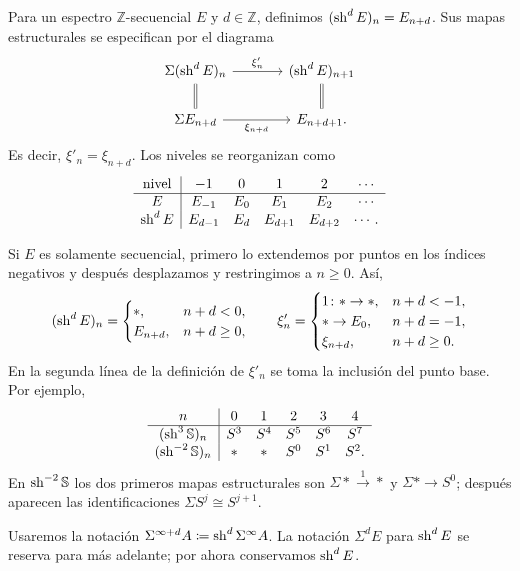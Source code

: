 \begin{defi}\label{defi:desplazamiento}
Para un espectro $\mathbb Z$-secuencial $E$ y $d\in\mathbb Z$, definimos $(\operatorname{sh}^dE)_n=E_{n+d}$. Sus mapas estructurales se especifican por el diagrama
\[
\begin{tikzcd}[column sep=large]
\Sigma(\sh^dE)_n \arrow[r,"\xi'_n"] \arrow[d,equal] & (\sh^dE)_{n+1} \arrow[d,equal]\\
\Sigma E_{n+d} \arrow[r,"\xi_{n+d}"'] & E_{n+d+1}.
\end{tikzcd}
\]
Es decir, $\xi'_n=\xi_{n+d}$. Los niveles se reorganizan como
\[
\begin{array}{c|ccccc}
\text{nivel}&-1&0&1&2&\cdots\\\hline
E&E_{-1}&E_0&E_1&E_2&\cdots\\
\operatorname{sh}^dE&E_{d-1}&E_d&E_{d+1}&E_{d+2}&\cdots.
\end{array}
\]
\end{defi}

Si $E$ es solamente secuencial, primero lo extendemos por puntos en los índices negativos y después desplazamos y restringimos a $n\ge0$. Así,
\[
(\operatorname{sh}^dE)_n=
\begin{cases}
*,&n+d<0,\\
E_{n+d},&n+d\ge0,
\end{cases}
\qquad
\xi'_n=
\begin{cases}
1\colon *\to*,&n+d<-1,\\
*\to E_0,&n+d=-1,\\
\xi_{n+d},&n+d\ge0.
\end{cases}
\]
En la segunda línea de la definición de $\xi'_n$ se toma la inclusión del punto base. Por ejemplo,
\[
\begin{array}{c|ccccc}
 n&0&1&2&3&4\\\hline
(\operatorname{sh}^3\mathbb S)_n&S^3&S^4&S^5&S^6&S^7\\
(\operatorname{sh}^{-2}\mathbb S)_n&*&*&S^0&S^1&S^2.
\end{array}
\]
En $\operatorname{sh}^{-2}\mathbb S$ los dos primeros mapas estructurales son $\Sigma*\xrightarrow{1}*$ y $\Sigma*\to S^0$; después aparecen las identificaciones $\Sigma S^j\cong S^{j+1}$.

Usaremos la notación $\Sigma^{\infty+d}A\coloneqq\operatorname{sh}^d\Sigma^\infty A$. La notación $\Sigma^dE$ para $\operatorname{sh}^dE$ se reserva para más adelante; por ahora conservamos $\operatorname{sh}^dE$.
